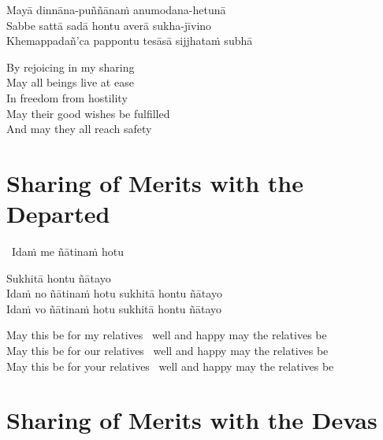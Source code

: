 Mayā dinnāna-puññānaṁ anumodana-hetunā\\
Sabbe sattā sadā hontu averā sukha-jīvino\\
Khemappadañ'ca pappontu tesāsā sijjhataṁ subhā

\begin{english-verses}
  By rejoicing in my sharing\\
  May all beings live at ease\\
  In freedom from hostility\\
  May their good wishes be fulfilled\\
  And may they all reach safety
\end{english-verses}

\suttaRef{[Thai]}


\section{Sharing of Merits with the Departed}
\label{sharing-merits-departed}

\begin{leader-only}
  \anglebracketleft\ \hspace{-0.5mm}Idaṁ me ñātinaṁ hotu \hspace{-0.5mm}\anglebracketright\
\end{leader-only}

\vspace{-0.99em}

Sukhitā hontu ñātayo\\
Idaṁ no ñātinaṁ hotu sukhitā hontu ñātayo\\
Idaṁ vo ñātinaṁ hotu sukhitā hontu ñātayo

\begin{english-verses}
  May this be for my relatives \breathmark\ well and happy may the relatives be\\
  May this be for our relatives \breathmark\ well and happy may the relatives be\\
  May this be for your relatives \breathmark\ well and happy may the relatives be
\end{english-verses}

\suttaRef{[Thai]}


\section{Sharing of Merits with the Devas}
\label{sharing-merits-devas}

